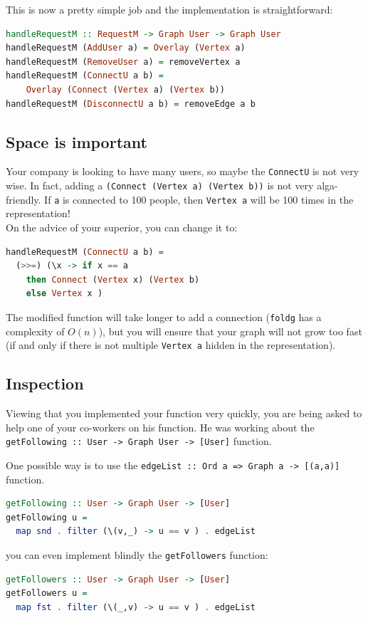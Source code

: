 \documentclass[10pt,a4paper]{article}
\begin{document}
This is now a pretty simple job and the implementation is straightforward:
\begin{lstlisting}[language=Haskell, frame=single]
handleRequestM :: RequestM -> Graph User -> Graph User
handleRequestM (AddUser a) = Overlay (Vertex a)
handleRequestM (RemoveUser a) = removeVertex a
handleRequestM (ConnectU a b) =
	Overlay (Connect (Vertex a) (Vertex b))
handleRequestM (DisconnectU a b) = removeEdge a b
\end{lstlisting}

\subsection{Space is important}
Your company is looking to have many users, so maybe the \verb|ConnectU| is not very wise. In fact, adding a \verb|(Connect (Vertex a) (Vertex b))| is not very alga-friendly. If \verb|a| is connected to 100 people, then \verb|Vertex a| will be 100 times in the representation!
\\
On the advice of your superior, you can change it to:
\begin{lstlisting}[language=Haskell, frame=single]
handleRequestM (ConnectU a b) =
  (>>=) (\x -> if x == a
    then Connect (Vertex x) (Vertex b)
    else Vertex x )
\end{lstlisting}
The modified function will take longer to add a connection (\verb|foldg| has a complexity of $O(n)$), but you will ensure that your graph will not grow too fast (if and only if there is not multiple \verb|Vertex a| hidden in the representation).

\subsection{Inspection}
Viewing that you implemented your function very quickly, you are being asked to help one of your co-workers on his function. He was working about the \verb|getFollowing :: User -> Graph User -> [User]| function.

One possible way is to use the \verb|edgeList :: Ord a => Graph a -> [(a,a)]| function.

\begin{lstlisting}[language=Haskell, frame=single]
getFollowing :: User -> Graph User -> [User]
getFollowing u =
  map snd . filter (\(v,_) -> u == v ) . edgeList
\end{lstlisting}

you can even implement blindly the \verb|getFollowers| function:
\begin{lstlisting}[language=Haskell, frame=single]
getFollowers :: User -> Graph User -> [User]
getFollowers u =
  map fst . filter (\(_,v) -> u == v ) . edgeList
\end{lstlisting}
\end{document}

